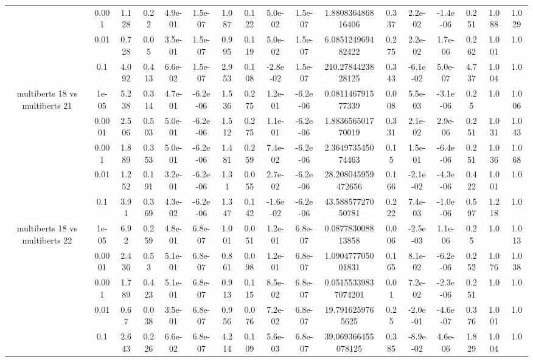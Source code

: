 \begin{tabular}{|c|c|c|c|c|c|c|c|c|c|c|c|c|c|c|c|c|}
 & 0.001 & 1.128 & 0.22 & 4.9e-01 & 1.5e-07 & 1.087 & 0.122 & 5.0e-02 & 1.5e-07 & 1.880836486816406 & 0.337 & 2.2e-02 & -1.4e-06 & 0.251 & 1.088 & 1.029 \\
 & 0.01 & 0.728 & 0.05 & 3.5e-01 & 1.5e-07 & 0.995 & 0.119 & 5.0e-02 & 1.5e-07 & 6.085124969482422 & 0.275 & 2.2e-02 & 1.7e-06 & 0.262 & 1.001 & 1.0 \\
 & 0.1 & 4.092 & 0.413 & 6.6e-02 & 1.5e-07 & 2.953 & 0.108 & -2.8e-02 & 1.5e-07 & 210.2784423828125 & 0.343 & -6.1e-02 & 5.0e-07 & 4.737 & 1.004 & 1.0 \\
\hline
\multirow{5}{*}{multiberts 18 vs multiberts 21} & 1e-05 & 5.238 & 0.314 & 4.7e-01 & -6.2e-06 & 1.536 & 0.275 & 1.2e-01 & -6.2e-06 & 0.081146791577339 & 0.008 & 5.5e-03 & -3.1e-06 & 0.25 & 1.0 & 1.006 \\
 & 0.0001 & 2.506 & 0.503 & 5.0e-01 & -6.2e-06 & 1.512 & 0.275 & 1.1e-01 & -6.2e-06 & 1.883656501770019 & 0.331 & 2.1e-02 & 2.9e-06 & 0.251 & 1.031 & 1.043 \\
 & 0.001 & 1.889 & 0.353 & 5.0e-01 & -6.2e-06 & 1.481 & 0.259 & 7.4e-02 & -6.2e-06 & 2.364973545074463 & 0.15 & 1.5e-01 & -6.4e-06 & 0.251 & 1.036 & 1.068 \\
 & 0.01 & 1.252 & 0.191 & 3.2e-01 & -6.2e-06 & 1.31 & 0.055 & 2.7e-02 & -6.2e-06 & 28.208045959472656 & 0.166 & -2.1e-02 & -4.3e-06 & 0.422 & 1.001 & 1.0 \\
 & 0.1 & 3.91 & 0.369 & 4.3e-02 & -6.2e-06 & 1.347 & 0.142 & -1.6e-02 & -6.2e-06 & 43.58857727050781 & 0.222 & 7.4e-03 & -1.0e-06 & 0.597 & 1.218 & 1.0 \\
\hline
\multirow{5}{*}{multiberts 18 vs multiberts 22} & 1e-05 & 6.92 & 0.259 & 4.8e-01 & 6.8e-07 & 1.001 & 0.051 & 1.2e-01 & 6.8e-07 & 0.087783008813858 & 0.006 & -2.5e-03 & 1.1e-06 & 0.25 & 1.0 & 1.013 \\
 & 0.0001 & 2.436 & 0.53 & 5.1e-01 & 6.8e-07 & 0.861 & 0.098 & 1.2e-01 & 6.8e-07 & 1.090477705001831 & 0.165 & 8.1e-02 & -6.2e-06 & 0.252 & 1.076 & 1.038 \\
 & 0.001 & 1.789 & 0.423 & 5.1e-01 & 6.8e-07 & 0.913 & 0.115 & 8.5e-02 & 6.8e-07 & 0.05155339837074201 & 0.01 & 7.2e-02 & -2.3e-06 & 0.251 & 1.0 & 1.0 \\
 & 0.01 & 0.67 & 0.038 & 3.5e-01 & 6.8e-07 & 0.956 & 0.076 & 7.2e-02 & 6.8e-07 & 19.7916259765625 & 0.25 & -2.0e-01 & -4.6e-07 & 0.376 & 1.001 & 1.0 \\
 & 0.1 & 2.643 & 0.226 & 6.6e-02 & 6.8e-07 & 4.214 & 0.109 & 5.6e-03 & 6.8e-07 & 39.069366455078125 & 0.385 & -8.9e-02 & 4.6e-06 & 1.829 & 1.004 & 1.0 \\

\end{tabular}
